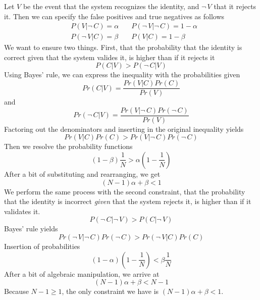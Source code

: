 \documentclass[10pt,a4paper]{article}
\begin{document}
Let $V$ be the event that the system recognizes the identity, and
$\neg\,V$ that it rejects it. Then we can specify the false positives
and true negatives as follows
\begin{align}
  &P(V|\neg\,C) = \alpha \quad &P(\neg\,V|\neg\,C) = 1 - \alpha\\
  &P(\neg\,V|C) = \beta \quad &P(V|C) = 1 - \beta
\end{align}
We want to ensure two things. First, that the probability that the
identity is correct given that the system valides it, is higher than
if it rejects it
\begin{equation}
  P(C|V) > P(\neg\,C|V)
\end{equation}
Using Bayes' rule, we can express the inequality with the
probabilities given
\begin{equation}
  Pr(C|V) = \frac{Pr(V|C)Pr(C)}{Pr(V)}
\end{equation}
and
\begin{equation}
  Pr(\neg\,C|V) = \frac{Pr(V|\neg\,C)Pr(\neg\,C)}{Pr(V)}
\end{equation}
Factoring out the denominators and inserting in the original
inequality yields
\begin{equation}
  Pr(V|C)Pr(C) > Pr(V|\neg\,C)Pr(\neg\,C)
\end{equation}
Then we resolve the probability functions
\begin{equation}
  (1-\beta)\frac{1}{N} > \alpha\left(1-\frac{1}{N}\right)
\end{equation}
After a bit of substituting and rearranging, we get
\begin{equation}
  (N - 1)\alpha + \beta < 1
\end{equation}
We perform the same process with the second constraint, that the
probability that the identity is incorrect \textit{given} that the
system rejects it, is higher than if it validates it.
\begin{equation}
  P(\neg\,C|\neg\,V) > P(C|\neg\,V)
\end{equation}
Bayes' rule yields
\begin{equation}
  Pr(\neg\,V|\neg\,C)Pr(\neg\,C) > Pr(\neg\,V|C)Pr(C)
\end{equation}
Insertion of probabilities
\begin{equation}
  (1-\alpha)\left(1 - \frac{1}{N}\right) < \beta\frac{1}{N}
\end{equation}
After a bit of algebraic manipulation, we arrive at
\begin{equation}
  (N - 1)\alpha + \beta < N - 1
\end{equation}
Because $N - 1 \geq 1$, the only constraint we have is $(N - 1)\alpha
+ \beta < 1$.
\end{document}

